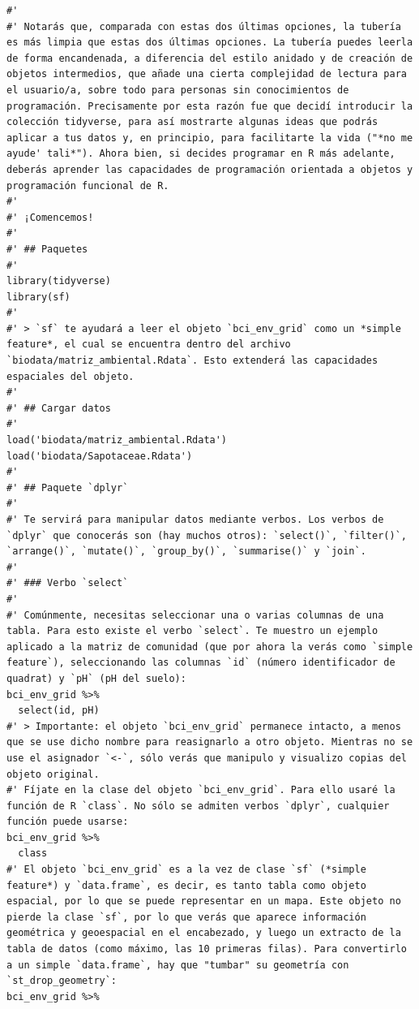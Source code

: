 \documentclass[11pt,]{article}
\begin{document}
\begin{verbatim}
#' 
#' Notarás que, comparada con estas dos últimas opciones, la tubería es más limpia que estas dos últimas opciones. La tubería puedes leerla de forma encandenada, a diferencia del estilo anidado y de creación de objetos intermedios, que añade una cierta complejidad de lectura para el usuario/a, sobre todo para personas sin conocimientos de programación. Precisamente por esta razón fue que decidí introducir la colección tidyverse, para así mostrarte algunas ideas que podrás aplicar a tus datos y, en principio, para facilitarte la vida ("*no me ayude' tali*"). Ahora bien, si decides programar en R más adelante, deberás aprender las capacidades de programación orientada a objetos y programación funcional de R.
#' 
#' ¡Comencemos!
#' 
#' ## Paquetes
#' 
library(tidyverse)
library(sf)
#' 
#' > `sf` te ayudará a leer el objeto `bci_env_grid` como un *simple feature*, el cual se encuentra dentro del archivo `biodata/matriz_ambiental.Rdata`. Esto extenderá las capacidades espaciales del objeto.
#' 
#' ## Cargar datos
#' 
load('biodata/matriz_ambiental.Rdata')
load('biodata/Sapotaceae.Rdata')
#'  
#' ## Paquete `dplyr`
#' 
#' Te servirá para manipular datos mediante verbos. Los verbos de `dplyr` que conocerás son (hay muchos otros): `select()`, `filter()`, `arrange()`, `mutate()`, `group_by()`, `summarise()` y `join`.
#' 
#' ### Verbo `select`
#' 
#' Comúnmente, necesitas seleccionar una o varias columnas de una tabla. Para esto existe el verbo `select`. Te muestro un ejemplo aplicado a la matriz de comunidad (que por ahora la verás como `simple feature`), seleccionando las columnas `id` (número identificador de quadrat) y `pH` (pH del suelo):
bci_env_grid %>%
  select(id, pH)
#' > Importante: el objeto `bci_env_grid` permanece intacto, a menos que se use dicho nombre para reasignarlo a otro objeto. Mientras no se use el asignador `<-`, sólo verás que manipulo y visualizo copias del objeto original.
#' Fíjate en la clase del objeto `bci_env_grid`. Para ello usaré la función de R `class`. No sólo se admiten verbos `dplyr`, cualquier función puede usarse:
bci_env_grid %>%
  class
#' El objeto `bci_env_grid` es a la vez de clase `sf` (*simple feature*) y `data.frame`, es decir, es tanto tabla como objeto espacial, por lo que se puede representar en un mapa. Este objeto no pierde la clase `sf`, por lo que verás que aparece información geométrica y geoespacial en el encabezado, y luego un extracto de la tabla de datos (como máximo, las 10 primeras filas). Para convertirlo a un simple `data.frame`, hay que "tumbar" su geometría con `st_drop_geometry`:
bci_env_grid %>%

\end{verbatim}
\end{document}
